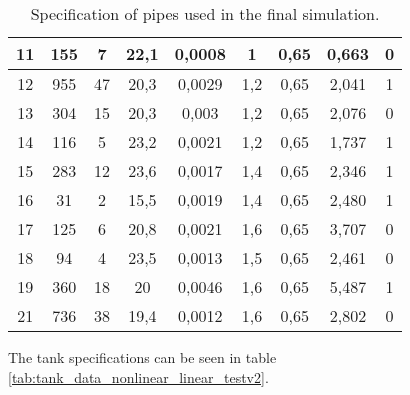 \begin{table}[H]
\begin{tabular}{|c|c|c|c|c|c|c|c|c|}
11                                                         & 155            & 7        & 22,1       & 0,0008 & 1         & 0,65     & 0,663     &0         \\ \hline
12                                                         & 955            & 47       & 20,3       & 0,0029 & 1,2       & 0,65     & 2,041     &1         \\ \hline
13                                                         & 304            & 15       & 20,3       & 0,003  & 1,2       & 0,65     & 2,076     &0         \\ \hline
14                                                         & 116            & 5        & 23,2       & 0,0021 & 1,2       & 0,65     & 1,737     &1         \\ \hline
15                                                         & 283            & 12       & 23,6       & 0,0017 & 1,4       & 0,65     & 2,346     &1          \\ \hline
16                                                         & 31             & 2        & 15,5       & 0,0019 & 1,4       & 0,65     & 2,480     &1          \\ \hline
17                                                         & 125            & 6        & 20,8       & 0,0021 & 1,6       & 0,65     & 3,707     &0          \\ \hline
18                                                         & 94             & 4        & 23,5       & 0,0013 & 1,5       & 0,65     & 2,461     &0             \\ \hline
19                                                         & 360            & 18       & 20         & 0,0046 & 1,6       & 0,65     & 5,487     &1           \\ \hline
21                                                         & 736            & 38       & 19,4         & 0,0012 & 1,6       & 0,65     & 2,802   &0          \\ \hline
\end{tabular}
\caption{Specification of pipes used in the final simulation.}
\label{tab:pipe_data_nonlinear_linear_testv2}
\end{table}

The tank specifications can be seen in table \ref{tab:tank_data_nonlinear_linear_testv2}.

